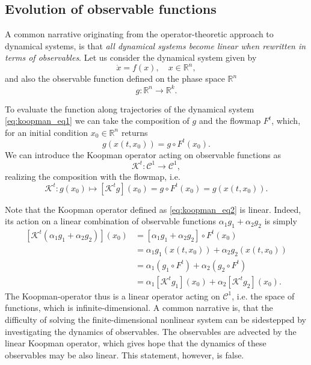 \subsection{Evolution of observable functions}
A common narrative originating from the operator-theoretic approach to dynamical systems, is that {\em all dynamical systems become linear when rewritten in terms of observables}. Let us consider the dynamical system given by 
\begin{equation}
\label{eq:koopman_eq1}
\dot{x} = f(x), \quad x\in \mathbb{R}^n,
\end{equation}
and also the observable function defined on the phase space $\mathbb{R}^n$
\begin{equation}
g : \mathbb{R}^n\to \mathbb{R}^k.
\end{equation}

To evaluate the function along trajectories of the dynamical system \eqref{eq:koopman_eq1} we can take the composition of $g$ and the flowmap $F^t$, which, for an initial condition $x_0\in \mathbb{R}^n$ returns
\begin{equation}
g\left(x(t, x_0)\right) = g \circ F^t(x_0).
\end{equation}
We can introduce the Koopman operator acting on observable functions as 
\begin{equation}
\mathcal{K}^t : \mathcal{C}^1 \to \mathcal{C}^1,
\end{equation}
realizing the composition with the flowmap, i.e. 
\begin{equation}
\label{eq:koopman_eq2}
\mathcal{K}^t: g(x_0) \mapsto \left[\mathcal{K}^t g\right](x_0) = g\circ F^t(x_0) = g(x(t,x_0)).
\end{equation} 

Note that the Koopman operator defined as \eqref{eq:koopman_eq2} is linear. Indeed, its action on a linear combination of observable functions $\alpha_1 g_1 + \alpha_2 g_2$ is simply
\begin{align}
\left[\mathcal{K}^t(\alpha_1 g_1 + \alpha_2 g_2)\right](x_0) &= [\alpha_1 g_1 + \alpha_2 g_2]\circ F^t(x_0) \\
 &= \alpha_1 g_1(x(t,x_0)) + \alpha_2 g_2(x(t,x_0)) \\
 & = \alpha_1(g_1 \circ F^t) + \alpha_2 (g_2 \circ F^t) \\
 & = \alpha_1 \left[\mathcal{K}^tg_1\right](x_0) + \alpha_2 \left[\mathcal{K}^tg_2\right](x_0).
\end{align}
The Koopman-operator thus is a linear operator acting on $\mathcal{C}^1$, i.e. the space of functions, which is infinite-dimensional. A common narrative is, that the difficulty of solving the finite-dimensional nonlinear system can be sidestepped by investigating the dynamics of observables. The observables are advected by the linear Koopman operator, which gives hope that the dynamics of these observables may be also linear. This statement, however, is false. 

